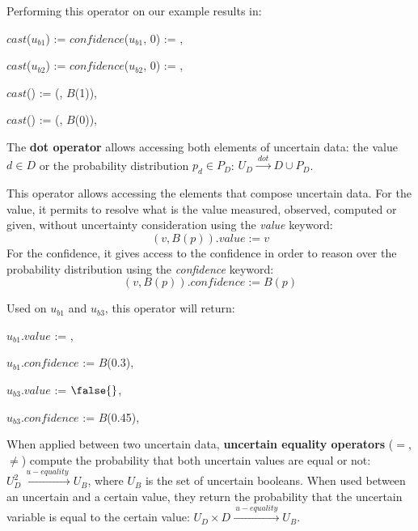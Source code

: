 Performing this operator on our example results in:
\begin{itemize*}
    \item[] $cast$($u_{b1}$) := $confidence$($u_{b1}$, 0) := \false{},
    \item[] $cast$($u_{b2}$) := $confidence$($u_{b2}$, 0) := \true{},
    \item[] $cast$(\true{}) := (\true{}, $B$(1)),
    \item[] $cast$(\false{}) := (\false{}, $B$(0)),
\end{itemize*}            			
		
\begin{operator}
    \label{op:dot}
    The \textbf{dot operator} allows accessing both elements of uncertain data: the value $d \in D$ or the probability distribution $p_d \in P_D$: $U_D \xrightarrow{~dot~} D \cup P_D$.
\end{operator}

This operator allows accessing the elements that compose uncertain data.
For the value, it permits to resolve what is the value measured, observed, computed or given, without uncertainty consideration using the \textit{value} keyword:
$$(v, B(p)).value := v$$
For the confidence, it gives access to the confidence in order to reason over the probability distribution using the \textit{confidence} keyword:
$$(v, B(p)).confidence := B(p)$$

Used on $u_{b1}$ and $u_{b3}$, this operator will return:
\begin{itemize*}
    \item[] $u_{b1}$.$value$ := \true{},
    \item[]  $u_{b1}$.$confidence$ := $B$(0.3),
    \item[] $u_{b3}$.$value$ := $\false{}$,
    \item[] $u_{b3}$.$confidence$ := $B$(0.45),
\end{itemize*}

\begin{operator}
	\label{op:u-equality}
	When applied between two uncertain data, \textbf{uncertain equality operators} ($=$, $\neq$) compute the probability that both uncertain values are equal or not: $U_D^2 \xrightarrow{~u-equality~} U_B$, where $U_B$ is the set of uncertain booleans.
	When used between an uncertain and a certain value, they return the probability that the uncertain variable is equal to the certain value: $U_D \times D \xrightarrow{~u-equality~} U_B$.
\end{operator}

